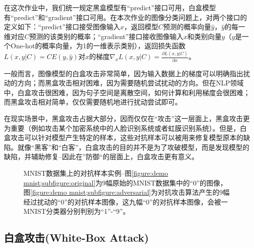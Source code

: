 \documentclass[journal, a4paper]{IEEEtran}
\begin{document}
在这次作业中，我们统一规定黑盒模型有``predict''接口可用，白盒模型有``predict''和``gradient''接口可用。在本次作业的图像分类问题上，对两个接口的定义如下：``predict''接口接受图像输入$x$，返回模型$C$预测的概率向量$\hat y$，$\hat y$的每一维对应$C$预测的该类别的概率；``gradient''接口接收图像输入$x$和类别向量$y$（$y$是一个One-hot的概率向量，为1的一维表示类别），返回损失函数$L(x,y|C)=CE(y,\hat y)$对$x$的梯度$\nabla_xL(x,y|C)=\frac{\partial L(x,y|C)}{\partial x}$。


一般而言，图像模型的白盒攻击非常简单，因为输入数据上的梯度可以明确指出扰动的方向；而黑盒攻击相对困难，因为需要随机尝试扰动的方向。但在NLP领域中，白盒攻击很困难，因为句子空间是离散空间，如何计算和利用梯度会很困难；而黑盒攻击相对简单，仅仅需要随机地进行扰动尝试即可。

在现实场景中，黑盒攻击占据大部分，因而仅仅在``攻击''这一层面上，黑盒攻击更为重要（例如攻击某个加密系统中的人脸识别系统或者虹膜识别系统）。但是，白盒攻击可以针对模型产生特定的样本，这些对抗样本可以被用来修复模型原本的缺陷。就像``黑客''和``白客''，白盒攻击的目的并不是为了攻破模型，而是发现模型的缺陷，并辅助修复--因此在''防御``的层面上，白盒攻击更有意义。

\begin{figure}[t]\footnotesize
    \centering
    \caption{MNIST数据集上的对抗样本实例--图\ref{figure:demo mnist;subfigure:original}为9幅原始的MNIST数据集中的``0''的图像，图\ref{figure:demo mnist;subfigure:adversarial}为对抗攻击算法产生的9幅经过扰动的``0''的对抗样本图像，这九幅``0''的对抗样本图像，会被一MNIST分类器分别判别为``1''-``9''。}
    \label{figure:demo mnist}
\end{figure}

\subsection{白盒攻击(White-Box Attack)}
\label{section:adversarial attack;subsection:white-box}
\end{document}
